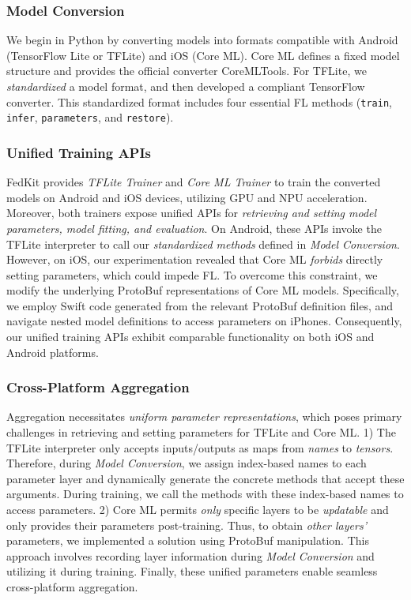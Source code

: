 \documentclass[conference]{IEEEtran}
\begin{document}
\subsubsection{Model Conversion}
We begin in Python by converting models into formats compatible with
Android (TensorFlow Lite or TFLite) and iOS (Core ML).
Core ML defines a fixed model structure and provides
the official converter CoreMLTools.
For TFLite, we \textit{standardized} a model format, and then
developed a compliant TensorFlow converter.
This standardized format includes
four essential FL methods
(\lstinline{train}, \lstinline{infer}, \lstinline{parameters},
and \lstinline{restore}).


\subsubsection{Unified Training APIs}
FedKit provides \textit{TFLite Trainer} and \textit{Core ML Trainer} to
train the converted models on Android and iOS devices,
utilizing GPU and NPU acceleration.
Moreover, both trainers expose unified APIs for
\textit{retrieving and setting model parameters,
    model fitting, and evaluation}.
On Android, these APIs invoke the TFLite interpreter to call
our \textit{standardized methods} defined in \textit{Model Conversion}.
However, on iOS, our experimentation revealed that
Core ML \textit{forbids} directly setting parameters, which could impede FL.
To overcome this constraint,
we modify the underlying ProtoBuf representations of
Core ML models.
Specifically,
we employ Swift code generated from the relevant ProtoBuf definition files,
and navigate nested model definitions to access parameters on iPhones.
Consequently, our unified training APIs exhibit comparable functionality on
both iOS and Android platforms.


\subsubsection{Cross-Platform Aggregation}
Aggregation necessitates
\textit{uniform parameter representations},
which poses primary challenges in
retrieving and setting parameters for TFLite and Core ML.
1)
The TFLite interpreter only accepts inputs/outputs as maps from \textit{names} to
\textit{tensors}.
Therefore, during \textit{Model Conversion},
we assign index-based names to each parameter layer and
dynamically generate the concrete methods that accept these arguments.
During training, we call the methods with these index-based names to
access parameters.
2)
Core ML permits \textit{only} specific layers to be \textit{updatable} and
only provides their parameters post-training.
Thus, to obtain \textit{other layers'} parameters,
we implemented a solution using ProtoBuf manipulation.
This approach involves recording layer information
during \textit{Model Conversion} and
utilizing it during training.
Finally, these unified parameters enable seamless cross-platform aggregation.
\end{document}
